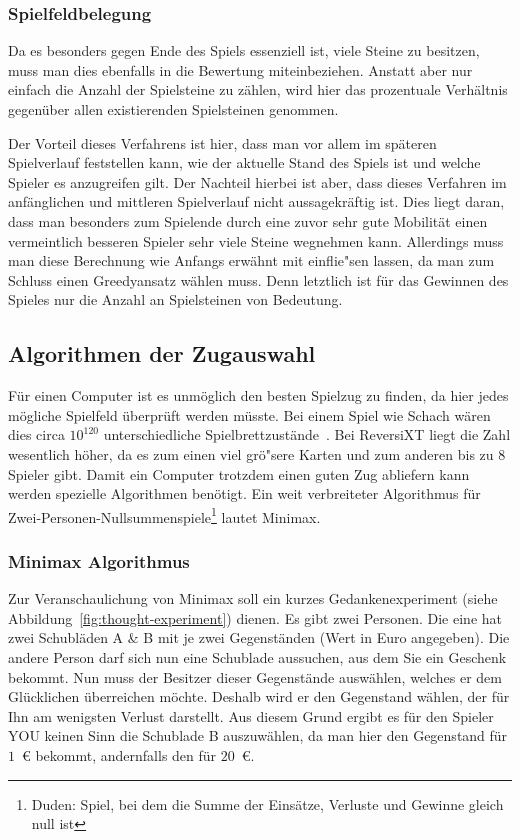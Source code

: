 \subsubsection{Spielfeldbelegung}\label{subsubsec:spielfeldbelegung}
Da es besonders gegen Ende des Spiels essenziell ist, viele Steine zu besitzen, muss man dies ebenfalls in die Bewertung miteinbeziehen.
Anstatt aber nur einfach die Anzahl der Spielsteine zu z\"ahlen, wird hier das prozentuale Verh\"altnis gegen\"uber allen existierenden Spielsteinen genommen.

Der Vorteil dieses Verfahrens ist hier, dass man vor allem im sp\"ateren Spielverlauf feststellen kann, wie der aktuelle Stand des Spiels ist und welche Spieler es anzugreifen gilt.
Der Nachteil hierbei ist aber, dass dieses Verfahren im anf\"anglichen und mittleren Spielverlauf nicht aussagekr\"aftig ist.
Dies liegt daran, dass man besonders zum Spielende durch eine zuvor sehr gute Mobilit\"at einen vermeintlich besseren Spieler sehr viele Steine wegnehmen kann.
Allerdings muss man diese Berechnung wie Anfangs erw\"ahnt mit einflie"sen lassen, da man zum Schluss einen Greedyansatz w\"ahlen muss.
Denn letztlich ist f\"ur das Gewinnen des Spieles nur die Anzahl an Spielsteinen von Bedeutung.

\newpage

\subsection{Algorithmen der Zugauswahl}\label{subsec:algorithmen-der-zugauswahl}
F\"ur einen Computer ist es unm\"oglich den besten Spielzug zu finden, da hier jedes m\"ogliche Spielfeld \"uberpr\"uft werden m\"usste.
Bei einem Spiel wie Schach w\"aren dies circa $10^{120}$ unterschiedliche Spielbrettzust\"ande~\cite{chessBoards}.
Bei ReversiXT liegt die Zahl wesentlich h\"oher, da es zum einen viel gr\"o"sere Karten und zum anderen bis zu 8 Spieler gibt.
Damit ein Computer trotzdem einen guten Zug abliefern kann werden spezielle Algorithmen ben\"otigt.
Ein weit verbreiteter Algorithmus f\"ur Zwei-Personen-Nullsummenspiele\footnote{Duden: Spiel, bei dem die Summe der Eins\"atze, Verluste und Gewinne gleich null ist} lautet Minimax.

\subsubsection{Minimax Algorithmus}\label{subsubsec:minimax-algorithmus}
Zur Veranschaulichung von Minimax soll ein kurzes Gedankenexperiment (siehe Abbildung~\ref{fig:thought-experiment}) dienen.
Es gibt zwei Personen.
Die eine hat zwei Schubl\"aden A \& B mit je zwei Gegenst\"anden (Wert in Euro angegeben).
Die andere Person darf sich nun eine Schublade aussuchen, aus dem Sie ein Geschenk bekommt.
Nun muss der Besitzer dieser Gegenst\"ande ausw\"ahlen, welches er dem Gl\"ucklichen \"uberreichen m\"ochte.
Deshalb wird er den Gegenstand w\"ahlen, der f\"ur Ihn am wenigsten Verlust darstellt.
Aus diesem Grund ergibt es f\"ur den Spieler YOU keinen Sinn die Schublade B auszuw\"ahlen, da man hier den Gegenstand f\"ur $1$~\euro{} bekommt, andernfalls den f\"ur $20$~\euro{}.

